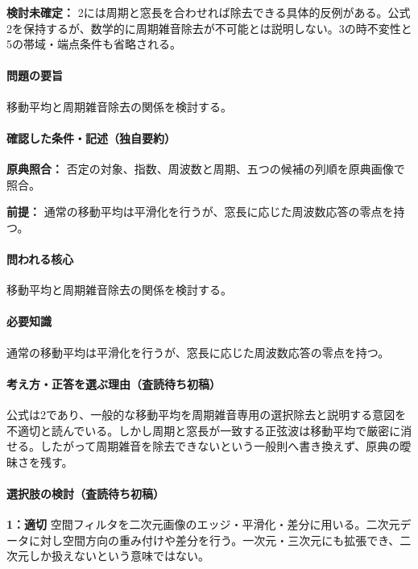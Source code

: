 \par\textbf{検討未確定：} 2には周期と窓長を合わせれば除去できる具体的反例がある。公式2を保持するが、数学的に周期雑音除去が不可能とは説明しない。3の時不変性と5の帯域・端点条件も省略される。

\paragraph{問題の要旨} 移動平均と周期雑音除去の関係を検討する。

\paragraph{確認した条件・記述（独自要約）}\mbox{}\par

\noindent\textbf{原典照合：} 否定の対象、指数、周波数と周期、五つの候補の列順を原典画像で照合。\par

\noindent\textbf{前提：} 通常の移動平均は平滑化を行うが、窓長に応じた周波数応答の零点を持つ。\par

\paragraph{問われる核心} 移動平均と周期雑音除去の関係を検討する。

\paragraph{必要知識} 通常の移動平均は平滑化を行うが、窓長に応じた周波数応答の零点を持つ。

\paragraph{考え方・正答を選ぶ理由（査読待ち初稿）} 公式は2であり、一般的な移動平均を周期雑音専用の選択除去と説明する意図を不適切と読んでいる。しかし周期と窓長が一致する正弦波は移動平均で厳密に消せる。したがって周期雑音を除去できないという一般則へ書き換えず、原典の曖昧さを残す。

\paragraph{選択肢の検討（査読待ち初稿）}\mbox{}\par

\noindent\textbf{1：適切} 空間フィルタを二次元画像のエッジ・平滑化・差分に用いる。二次元データに対し空間方向の重み付けや差分を行う。一次元・三次元にも拡張でき、二次元しか扱えないという意味ではない。\par

